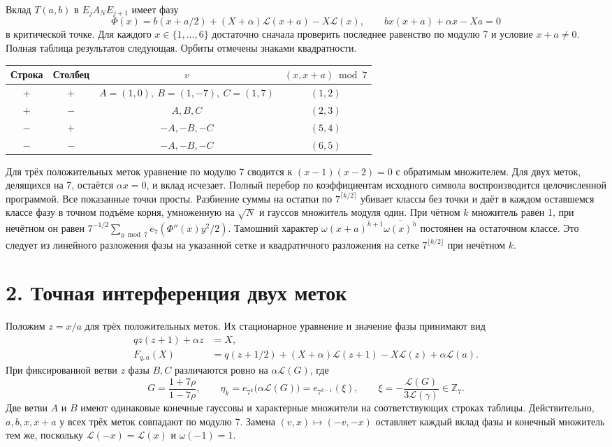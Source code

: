 \documentclass[11pt,a4paper]{article}
\newcommand{\sect}[1]{\section*{\sffamily\color{ink}#1}}
\newcommand{\Zp}{\mathbb Z_7}
\begin{document}
Вклад \(T(a,b)\) в \(E_jA_NE_{j+1}\) имеет фазу
\[
 \Phi(x)=b(x+a/2)+(X+\alpha)\mathcal L(x+a)-X\mathcal L(x),\qquad
        b x(x+a)+\alpha x-Xa=0
\]
в критической точке. Для каждого \(x\in\{1,\ldots,6\}\) достаточно сначала проверить последнее равенство по модулю 7 и условие \(x+a\ne0\). Полная таблица результатов следующая. Орбиты отмечены знаками квадратности.
\begin{center}
\begin{tabular}{cccc}
\toprule
Строка & Столбец & \(v\) & \((x,x+a)\bmod7\)\\
\midrule
\(+\)&\(+\)& \(A=(1,0),\ B=(1,-7),\ C=(1,7)\) & \((1,2)\)\\
\(+\)&\(-\)& \(A,B,C\)& \((2,3)\)\\
\(-\)&\(+\)& \(-A,-B,-C\)& \((5,4)\)\\
\(-\)&\(-\)& \(-A,-B,-C\)& \((6,5)\)\\
\bottomrule
\end{tabular}
\end{center}
Для трёх положительных меток уравнение по модулю 7 сводится к \((x-1)(x-2)=0\) с обратимым множителем. Для двух меток, делящихся на 7, остаётся \(\alpha x=0\), и вклад исчезает. Полный перебор по коэффициентам исходного символа воспроизводится целочисленной программой. Все показанные точки просты. Разбиение суммы на остатки по \(7^{\lceil k/2\rceil}\) убивает классы без точки и даёт в каждом оставшемся классе фазу в точном подъёме корня, умноженную на \(\sqrt N\) и гауссов множитель модуля один. При чётном \(k\) множитель равен 1, при нечётном он равен \(7^{-1/2}\sum_{y\bmod7}e_7(\Phi''(x)y^2/2)\). Тамошний характер \(\omega(x+a)^{h+1}\overline{\omega(x)^h}\) постоянен на остаточном классе. Это следует из линейного разложения фазы на указанной сетке и квадратичного разложения на сетке \(7^{\lfloor k/2\rfloor}\) при нечётном \(k\).

\newpage
\sect{2. Точная интерференция двух меток}
Положим \(z=x/a\) для трёх положительных меток. Их стационарное уравнение и значение фазы принимают вид
\[
 \begin{split}
 qz(z+1)+\alpha z&=X,\\
 F_{q,a}(X)&=q(z+1/2)+(X+\alpha)\mathcal L(z+1)-X\mathcal L(z)
                  +\alpha\mathcal L(a).
 \end{split}
\]
При фиксированной ветви \(z\) фазы \(B,C\) различаются ровно на \(\alpha\mathcal L(G)\), где
\[
 G=\frac{1+7\rho}{1-7\rho},\qquad
 \eta_k=e_{7^k}\bigl(\alpha\mathcal L(G)\bigr)
       =e_{7^{k-1}}(\xi),\qquad
 \xi=-\frac{\mathcal L(G)}{3\mathcal L(\gamma)}\in\Zp .
\]
Две ветви \(A\) и \(B\) имеют одинаковые конечные гауссовы и характерные множители на соответствующих строках таблицы. Действительно, \(a,b,x,x+a\) у всех трёх меток совпадают по модулю 7. Замена \((v,x)\mapsto(-v,-x)\) оставляет каждый вклад фазы и конечный множитель тем же, поскольку \(\mathcal L(-x)=\mathcal L(x)\) и \(\omega(-1)=1\).
\end{document}

